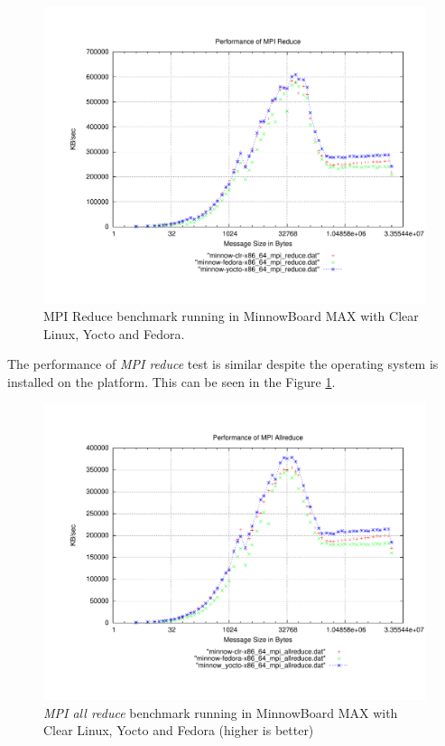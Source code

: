\begin{figure}
  \includegraphics[width=\paperwidth]{images/mpbench_yocto_experiments/mpi_reduce.pdf}
\caption{MPI Reduce benchmark running in MinnowBoard MAX with Clear Linux, Yocto
and Fedora.}
\label{mpi_reduce_yocto}
\end{figure}

The performance of \textit{MPI reduce} test is similar despite the operating
system is installed on the platform. This can be seen in the Figure
\ref{mpi_reduce_yocto}.

\begin{figure}
  \includegraphics[width=\paperwidth]{images/mpbench_yocto_experiments/mpi_allreduce.pdf}
\caption{\textit{MPI all reduce} benchmark running in  MinnowBoard MAX with Clear Linux,
Yocto and Fedora (higher is better)}
\label{mpi_allreduce_yocto}
\end{figure}

